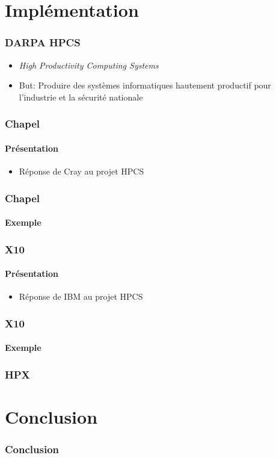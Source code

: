 \documentclass{beamer}
\begin{document}
\section{Implémentation}
\begin{frame}
\frametitle{DARPA HPCS}
\begin{itemize}
\item \textit{High Productivity Computing Systems}
\item But: Produire des systèmes informatiques hautement productif pour l'industrie et la sécurité nationale
\end{itemize}
\end{frame}

\begin{frame}
\frametitle{Chapel}
\framesubtitle{Présentation}
\begin{itemize}
\item Réponse de Cray au projet HPCS
\end{itemize}
\end{frame}

\begin{frame}
\frametitle{Chapel}
\framesubtitle{Exemple}
\end{frame}

\begin{frame}
\frametitle{X10}
\framesubtitle{Présentation}
\begin{itemize}
\item Réponse de IBM au projet HPCS
\end{itemize}
\end{frame}

\begin{frame}
\frametitle{X10}
\framesubtitle{Exemple}
\end{frame}

\begin{frame}
\frametitle{HPX}
\end{frame}

\section{Conclusion}
\begin{frame}
\frametitle{Conclusion}
\end{frame}
\end{document}

